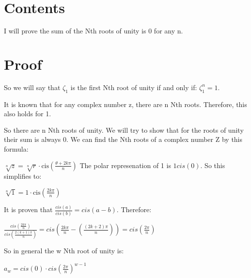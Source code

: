 \documentclass{article}
\begin{document}
\section{Contents}

I will prove the sum of the Nth roots of unity is 0 for any n.

\section{Proof}

So we will say that $\zeta_1$ is the first Nth root of unity if and only if:
$\zeta_1^n =1$.\bigskip

It is known that for any complex number z, there are n Nth roots. Therefore, this also holds for 1.

So there are n Nth roots of unity. We will try to show that for the roots of unity their sum is always 0.
We can find the Nth roots of a complex number Z by this formula:

$
\sqrt[n]{z} = \sqrt[n]{r} \cdot \text{cis} \left( \frac{\theta + 2k\pi}{n} \right)
$
The polar represenation of 1 is $ 1cis(0) $. So this simplifies to:

$ \sqrt[n]{1} = 1\cdot \text{cis} \left( \frac{2k\pi}{n} \right)$

It is proven that $ \frac{cis(a)}{cis(b)} = cis(a-b)$. Therefore:

$
\frac{cis(\frac{2k\pi}{n})}{cis(\frac{2(k+1)\pi}{n})}=
cis(\frac{2k\pi}{n} - (\frac{(2k+2)\pi} {n})) =
cis(\frac{2\pi}{n})
$

So in general the w Nth root of unity is: 

$ a_w =  cis(0)\cdot cis(\frac{2\pi}{n})^{w-1} $
\end{document}

